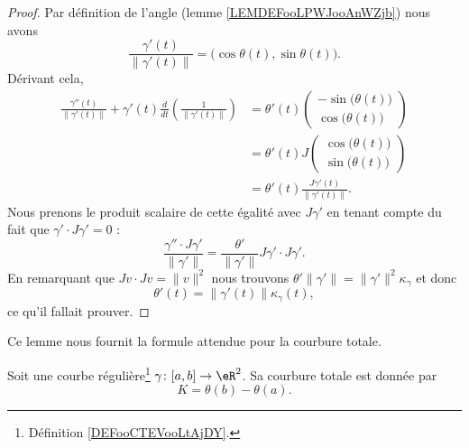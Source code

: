 \begin{proof}
    Par définition de l'angle (lemme \ref{LEMDEFooLPWJooAnWZjb}) nous avons
    \begin{equation}
        \frac{ \gamma'(t) }{ \| \gamma'(t) \| }=\big( \cos\theta(t),\sin\theta(t) \big).
    \end{equation}
    Dérivant cela,
    \begin{subequations}
        \begin{align}
            \frac{ \gamma''(t) }{ \| \gamma'(t) \| }+\gamma'(t)\frac{ d  }{ dt }\left( \frac{1}{ \| \gamma'(t) \| } \right)&=\theta'(t)
            \begin{pmatrix}
                -\sin\big( \theta(t) \big)\\
                \cos\big( \theta(t) \big)
            \end{pmatrix}\\
            &=\theta'(t)J\begin{pmatrix}
                \cos\big( \theta(t) \big)   \\ 
                \sin\big( \theta(t) \big)    
            \end{pmatrix}\\
            &=\theta'(t)\frac{ J\gamma'(t) }{ \| \gamma'(t) \| }.
        \end{align}
    \end{subequations}
    Nous prenons le produit scalaire de cette égalité avec \( J\gamma'\) en tenant compte du fait que \( \gamma'\cdot J\gamma'=0\) :
    \begin{equation}
        \frac{ \gamma''\cdot J\gamma' }{ \| \gamma' \| }=\frac{ \theta' }{ \| \gamma' \| }J\gamma'\cdot J\gamma'.
    \end{equation}
    En remarquant que \( Jv\cdot Jv=\| v \|^2\) nous trouvons \( \theta'\| \gamma' \|=\| \gamma' \|^2\kappa_{\gamma}\) et donc
    \begin{equation}
        \theta'(t)=\| \gamma'(t) \|\kappa_{\gamma}(t),
    \end{equation}
    ce qu'il fallait prouver.
\end{proof}
Ce lemme nous fournit la formule attendue pour la courbure totale.

\begin{lemma}
    Soit une courbe régulière\footnote{Définition \ref{DEFooCTEVooLtAjDY}.} \( \gamma\colon \mathopen[ a , b \mathclose]\to \eR^2\). Sa courbure totale est donnée par
    \begin{equation}
        K=\theta(b)-\theta(a).
    \end{equation}
\end{lemma}

